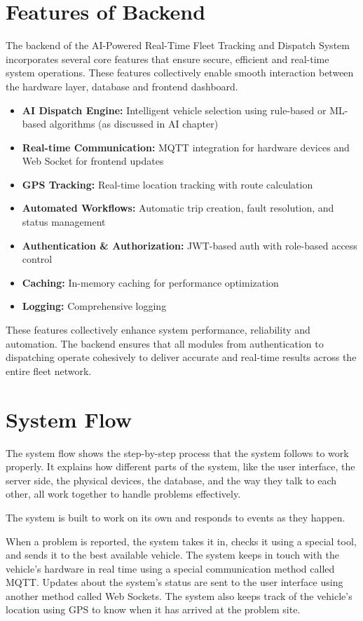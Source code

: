 \section{Features of Backend}
The backend of the AI-Powered Real-Time Fleet Tracking and Dispatch System incorporates several core features that ensure secure, efficient and real-time system operations. These features collectively enable smooth interaction between the hardware layer, database and frontend dashboard.
\begin{itemize}
    \item \textbf{AI Dispatch Engine:} Intelligent vehicle selection using rule-based or ML-based algorithms (as discussed in AI chapter)
    \item \textbf{Real-time Communication:} MQTT integration for hardware devices and Web Socket for frontend updates
    \item \textbf{GPS Tracking:} Real-time location tracking with route calculation
    \item \textbf{Automated Workflows:} Automatic trip creation, fault resolution, and status management
    \item \textbf{Authentication \& Authorization:} JWT-based auth with role-based access control
    \item \textbf{Caching:} In-memory caching for performance optimization
    \item \textbf{Logging:} Comprehensive logging
\end{itemize}

These features collectively enhance system performance, reliability and automation. The backend ensures that all modules from authentication to dispatching operate cohesively to deliver accurate and real-time results across the entire fleet network.

\section{System Flow}
The system flow shows the step-by-step process that the system follows to work properly. It explains how different parts of the system, like the user interface, the server side, the physical devices, the database, and the way they talk to each other, all work together to handle problems effectively.

The system is built to work on its own and responds to events as they happen.

When a problem is reported, the system takes it in, checks it using a special tool, and sends it to the best available vehicle. The system keeps in touch with the vehicle's hardware in real time using a special communication method called MQTT. Updates about the system's status are sent to the user interface using another method called Web Sockets. The system also keeps track of the vehicle's location using GPS to know when it has arrived at the problem site.

